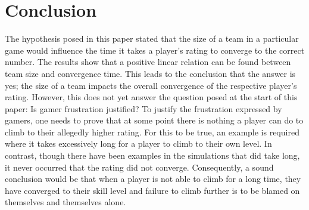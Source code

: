 \documentclass[12pt]{article}
\newcounter{lastnote}
\begin{document}
\section{Conclusion}

The hypothesis posed in this paper stated that the size of a team in a particular game would influence the time it takes a player's rating to converge to the correct number. The results show that a positive linear relation can be found between team size and convergence time. This leads to the conclusion that the answer is yes; the size of a team impacts the overall convergence of the respective player's rating.
However, this does not yet answer the question posed at the start of this paper: Is gamer frustration justified? To justify the frustration expressed by gamers, one needs to prove that at some point there is nothing a player can do to climb to their allegedly higher rating.
For this to be true, an example is required where it takes excessively long for a player to climb to their own level. In contrast, though there have been examples in the simulations that did take long, it never occurred that the rating did not converge. Consequently, a sound conclusion would be that when a player is not able to climb for a long time, they have converged to their skill level and failure to climb further is to be blamed on themselves and themselves alone.































\end{document}
